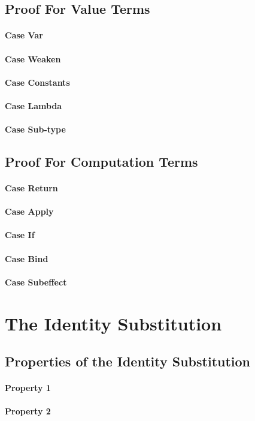 \documentclass{report}
\begin{document}
\subsection{Proof For Value Terms}
\paragraph{Case Var}

\paragraph{Case Weaken}

\paragraph{Case Constants}

\paragraph{Case Lambda}

\paragraph{Case Sub-type}

\subsection{Proof For Computation Terms}
\paragraph{Case Return}
\paragraph{Case Apply}

\paragraph{Case If}
\paragraph{Case Bind}
\paragraph{Case Subeffect}


\section{The Identity Substitution}
\subsection{Properties of the Identity Substitution}
\paragraph{Property 1}

\paragraph{Property 2}
\end{document}

